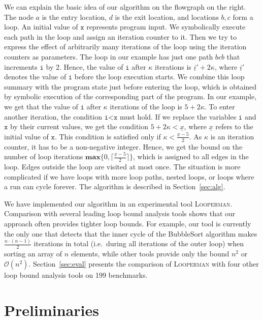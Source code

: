 \documentclass[10pt,a4paper]{article}
\newcommand{\Looperman}{\textsc{Looperman}\xspace}
\newcommand{\var}[1]{\texttt{#1}}
\newcommand{\sym}[1]{\ensuremath{\underline{#1}}}
\newcommand{\maxim}{\ensuremath{\mathbf{max}}}
\begin{document}
We can explain the basic idea of our algorithm on the
flowgraph on the right. The node $a$ is the entry location, $d$ is the exit
location, and locations $b,c$ form a loop. An initial value of
$\var{x}$ represents program input. We symbolically execute each path
in the loop and assign an iteration counter to it. Then we try to
express the effect of arbitrarily many iterations of the loop using
the iteration counters as parameters. The loop in our example has just
one path $bcb$ that increments $\var{i}$ by 2. Hence, the value of
$\var{i}$ after $\kappa$ iterations is $\sym{i}'+2\kappa$, where
$\sym{i}'$ denotes the value of $\var{i}$ before the loop execution
starts. We combine this loop summary with the program state just
before entering the loop, which is obtained by symbolic execution of
the corresponding part of the program. In our example, we get that the
value of $\var{i}$ after $\kappa$ iterations of the loop is
$5+2\kappa$. To enter another iteration, the condition $\texttt{i<x}$
must hold. If we replace the variables $\var{i}$ and $\var{x}$ by
their current values, we get the condition $5+2\kappa<\sym{x}$, where
$\sym{x}$ refers to the initial value of $\var{x}$. This condition is
satisfied only if $\kappa<\frac{\sym{x}-5}{2}$. As $\kappa$ is an
iteration counter, it has to be a non-negative integer. Hence, we get
the bound on the number of loop iterations
$\maxim\{0,\lceil\frac{\sym{x}-5}{2}\rceil\}$, which is assigned to
all edges in the loop. Edges outside the loop are visited at most
once. The situation is more complicated if we have loops with more
loop paths, nested loops, or loops where a run can cycle forever. The
algorithm is described in Section~\ref{sec:alg}. 

We have implemented our algorithm in an experimental tool \Looperman. Comparison
with several leading loop bound analysis tools shows that our approach often
provides tighter loop bounds. For example, our tool is currently the only one
that detects that the inner cycle of the BubbleSort algorithm makes
$\frac{n\cdot(n-1)}{2}$ iterations in total (i.e.~during all iterations of the
outer loop) when sorting an array of $n$ elements, while other tools provide
only the bound $n^2$ or $\mathcal{O}(n^2)$. Section~\ref{sec:eval} presents the
comparison of \Looperman with four other loop bound analysis tools on 199
benchmarks.





\section{Preliminaries}\label{sec:prelim}
\end{document}
